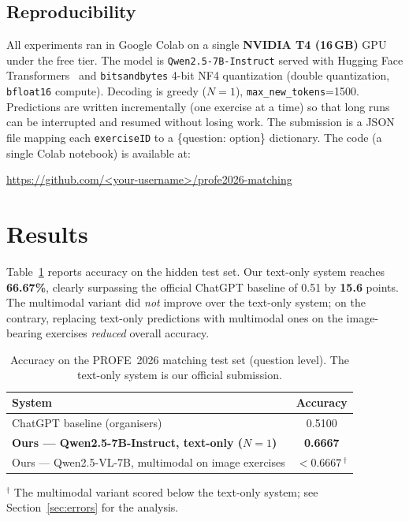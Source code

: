 \documentclass{ceurart}   %
\begin{document}
\subsection{Reproducibility}
\label{sec:repro}
All experiments ran in Google Colab on a single \textbf{NVIDIA T4
(16\,GB)} GPU under the free tier. The model is
\texttt{Qwen2.5-7B-Instruct} served with Hugging Face
Transformers~\cite{wolf2020transformers} and \texttt{bitsandbytes} 4-bit
NF4 quantization (double quantization, \texttt{bfloat16} compute). Decoding
is greedy ($N=1$), \texttt{max\_new\_tokens}=1500. Predictions are written
incrementally (one exercise at a time) so that long runs can be interrupted
and resumed without losing work. The submission is a JSON file mapping each
\texttt{exerciseID} to a \{question: option\} dictionary. The code (a single
Colab notebook) is available at:
\begin{center}
  \url{https://github.com/<your-username>/profe2026-matching} %
\end{center}

\section{Results}
Table~\ref{tab:results} reports accuracy on the hidden test set. Our
text-only system reaches \textbf{66.67\%}, clearly surpassing the official
ChatGPT baseline of 0.51 by \textbf{15.6} points. The multimodal variant did
\emph{not} improve over the text-only system; on the contrary, replacing
text-only predictions with multimodal ones on the image-bearing exercises
\emph{reduced} overall accuracy.

\begin{table}[t]
  \centering
  \caption{Accuracy on the PROFE~2026 matching test set (question level).
    The text-only system is our official submission.}
  \label{tab:results}
  \begin{tabular}{lc}
    \toprule
    \textbf{System} & \textbf{Accuracy} \\
    \midrule
    ChatGPT baseline (organisers) & 0.5100 \\
    \textbf{Ours --- Qwen2.5-7B-Instruct, text-only ($N{=}1$)} & \textbf{0.6667} \\
    Ours --- Qwen2.5-VL-7B, multimodal on image exercises & $<0.6667$\,$^{\dagger}$ \\
    \bottomrule
  \end{tabular}

  \vspace{2pt}
  {\footnotesize $^{\dagger}$ The multimodal variant scored below the
   text-only system; %
   see Section~\ref{sec:errors} for the analysis.}
\end{table}
\end{document}
